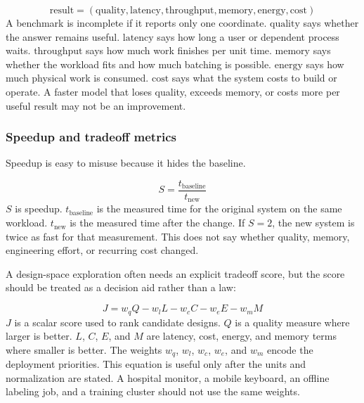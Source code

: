 \begin{keyequation}
\[
  \text{result}
  =
  \left(
  \text{quality},
  \text{latency},
  \text{throughput},
  \text{memory},
  \text{energy},
  \text{cost}
  \right)
\]
\tcblower
A benchmark is incomplete if it reports only one coordinate. \(\text{quality}\) says whether the answer remains useful. \(\text{latency}\) says how long a user or dependent process waits. \(\text{throughput}\) says how much work finishes per unit time. \(\text{memory}\) says whether the workload fits and how much batching is possible. \(\text{energy}\) says how much physical work is consumed. \(\text{cost}\) says what the system costs to build or operate. A faster model that loses quality, exceeds memory, or costs more per useful result may not be an improvement.
\end{keyequation}

\subsubsection{Speedup and tradeoff metrics}

Speedup is easy to misuse because it hides the baseline.

\begin{keyequation}[Speedup]
\[
  S =
  \frac{t_{\text{baseline}}}{t_{\text{new}}}
\]
\tcblower
\(S\) is speedup. \(t_{\text{baseline}}\) is the measured time for the original system on the same workload. \(t_{\text{new}}\) is the measured time after the change. If \(S=2\), the new system is twice as fast for that measurement. This does not say whether quality, memory, engineering effort, or recurring cost changed.
\end{keyequation}

A design-space exploration often needs an explicit tradeoff score, but the score should be treated as a decision aid rather than a law:

\begin{keyequation}
\[
  J =
  w_q Q
  - w_l L
  - w_c C
  - w_e E
  - w_m M
\]
\tcblower
\(J\) is a scalar score used to rank candidate designs. \(Q\) is a quality measure where larger is better. \(L\), \(C\), \(E\), and \(M\) are latency, cost, energy, and memory terms where smaller is better. The weights \(w_q\), \(w_l\), \(w_c\), \(w_e\), and \(w_m\) encode the deployment priorities. This equation is useful only after the units and normalization are stated. A hospital monitor, a mobile keyboard, an offline labeling job, and a training cluster should not use the same weights.
\end{keyequation}

